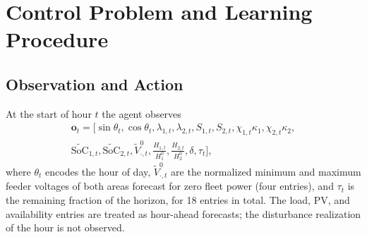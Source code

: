 \section{Control Problem and Learning Procedure}
\label{sec:control}

\subsection{Observation and Action}
\label{sec:obsact}

At the start of hour $t$ the agent observes
\begin{multline}
\mathbf{o}_t=\Big[\sin\theta_t,\cos\theta_t,\lambda_{1,t},\lambda_{2,t},
S_{1,t},S_{2,t},\chi_{1,t}\kappa_1,\chi_{2,t}\kappa_2,\\
\widetilde{\mathrm{SoC}}_{1,t},\widetilde{\mathrm{SoC}}_{2,t},
\tilde V^{0}_{\cdot,t},\frac{H_{1,t}}{H_1^0},\frac{H_{2,t}}{H_2^0},\delta,\tau_t\Big],
\label{eq:obs}
\end{multline}
where $\theta_t$ encodes the hour of day, $\tilde V^{0}_{\cdot,t}$ are
the normalized minimum and maximum feeder voltages of both areas
forecast for zero fleet power (four entries), and $\tau_t$ is the
remaining fraction of the horizon, for 18 entries in total. The load,
PV, and availability entries are treated as hour-ahead forecasts; the
disturbance realization of the hour is not observed.


